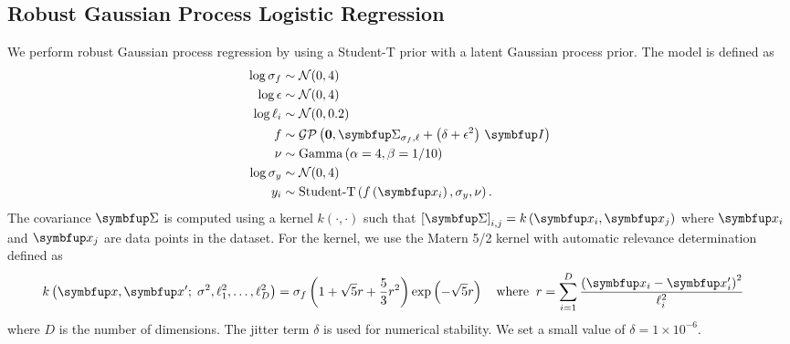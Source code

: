 \subsection{Robust Gaussian Process Logistic Regression}\label{section:model_rgp}
We perform robust Gaussian process regression by using a Student-T prior with a latent Gaussian process prior.
The model is defined as
\begin{align*}
   \log \sigma_f &\sim \mathcal{N}(0, 4) \\
   \log \epsilon &\sim \mathcal{N}(0, 4) \\
   \log \ell_i   &\sim \mathcal{N}(0, 0.2) \\
   f   &\sim \mathcal{GP}\left(\mathbf{0}, \mSigma_{\sigma_f, \mathbf{\ell}} + \left(\delta + \epsilon^2\right)\,\mI \right) \\
   \nu &\sim \mathrm{Gamma}\left(\alpha=4, \beta=1/10\right) \\
   \log \sigma_y &\sim \mathcal{N}(0, 4) \\
   y_i &\sim \text{Student-T}\left(  f\left( \vx_i \right), \sigma_y, \nu  \right).
\end{align*}
The covariance \(\mSigma\) is computed using a kernel \(k\left(\cdot, \cdot\right)\) such that \({[\mSigma]}_{i,j} = k\left( \vx_{i}, \vx_{j} \right) \) where \(\vx_i\) and \(\vx_j\) are data points in the dataset.
For the kernel, we use the Matern 5/2 kernel with automatic relevance determination~\citep{neal_bayesian_1996} defined as
\begin{align*}
  &k\left(\vx, \vx' ;\; \sigma^2, \ell^2_1, \ldots, \ell^2_D \right) =
  \sigma_f \left( 1 + \sqrt{5} r + \frac{5}{3} r^2 \right) \exp\left( - \sqrt{5} r \right) \quad
  \text{where}\;\; r = \sum^{D}_{i=1} \frac{ {\left(\vx_i - \vx'_i\right)}^2 }{\ell^2_i}
\end{align*}
where \(D\) is the number of dimensions.
The jitter term \(\delta\) is used for numerical stability.
We set a small value of \(\delta = 1\times10^{-6}\).

